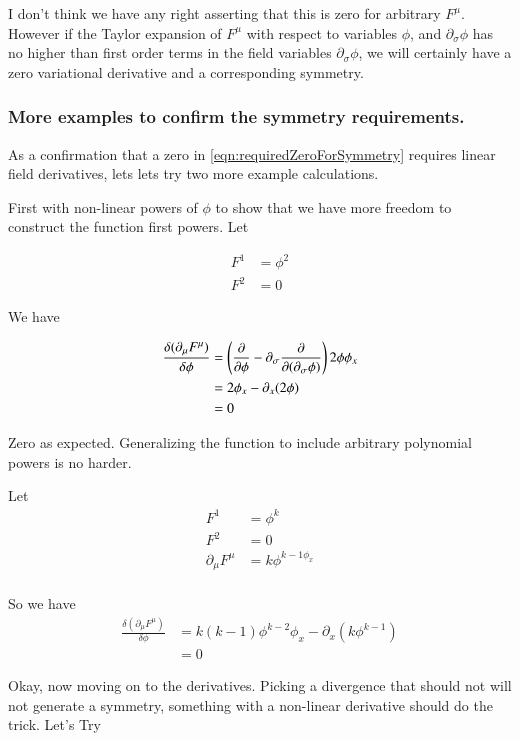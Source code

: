 \documentclass{article}
\begin{document}
I don't think we have any right asserting that this is zero for arbitrary $F^\mu$.  However
if the Taylor expansion of $F^\mu$ with respect to variables $\phi$, and $\partial_\sigma \phi$ has
no higher than first order terms in the field variables $\partial_\sigma \phi$, we will
certainly have a zero variational derivative and a corresponding symmetry.

\subsubsection{ More examples to confirm the symmetry requirements. }

As a confirmation that a zero in \ref{eqn:requiredZeroForSymmetry} requires linear field derivatives, 
lets lets try two more example calculations.  

First with non-linear
powers of $\phi$ to show that we have more freedom to construct the function first powers.  Let

\begin{align*}
F^1 &= \phi^2 \\
F^2 &= 0
\end{align*}

We have

\begin{align*}
\frac{\delta (\partial_\mu F^\mu)}{\delta \phi} 
&=
\left(\frac{\partial {}}{\partial {\phi}} - \partial_\sigma \frac{\partial {}}{\partial {(\partial_\sigma \phi)}}\right) 2 \phi \phi_x \\
&=
2 \phi_x - \partial_x (2 \phi) \\
&= 0
\end{align*}

Zero as expected.  Generalizing the function to include arbitrary polynomial powers is no harder.

Let
\begin{align*}
F^1 &= \phi^k \\
F^2 &= 0 \\
\partial_\mu F^\mu &= k \phi^{k-1 \phi_x} \\
\end{align*}

So we have
\begin{align*}
\frac{\delta (\partial_\mu F^\mu)}{\delta \phi}  
&= 
k (k-1) \phi^{k-2} \phi_x - \partial_x (k \phi^{k-1})  \\
&= 0
\end{align*}

Okay, now moving on to the derivatives.  Picking a divergence that should not will not generate a
symmetry, something with a non-linear derivative should do the trick.  Let's Try
\end{document}
